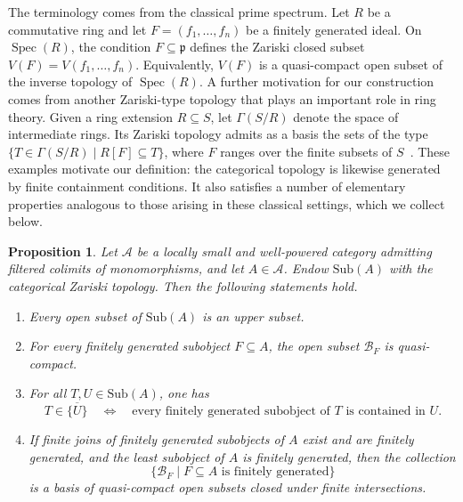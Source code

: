 \documentclass{amsproc}
\theoremstyle{definition}
\theoremstyle{plain}
\newtheorem{Prop}[theorem]{Proposition}
\theoremstyle{remark}
\numberwithin{equation}{section}
\newcommand{\Cal}[1]{{\mathcal #1}}
\newcommand{\Spec}{\operatorname{Spec}}
\newcommand{\sub}[1]{\mathrm{Sub} (#1)}
\begin{document}
The terminology comes from the classical prime spectrum. Let $R$ be a commutative ring and let $F=(f_1,\ldots,f_n)$ be a finitely generated ideal. On $\Spec(R)$, the condition $F\subseteq\mathfrak p$
defines the Zariski closed subset $V(F)=V(f_1,\ldots,f_n)$.
Equivalently, $V(F)$ is a quasi-compact open subset of the inverse topology of $\Spec(R)$. 
A further motivation for our construction comes from another Zariski-type topology that plays an important role in ring theory. Given a ring extension $R\subseteq S$, let $\Gamma(S/R)$ denote the space of intermediate rings. Its Zariski topology admits as a basis the sets of the type
$\{T\in\Gamma(S/R)\mid R[F]\subseteq T\}$, where $F$ ranges over the finite subsets of $S$~\cite[Proposition~3.5]{finocchiaro-ultrafiltri}.
These examples motivate our definition: the categorical topology is likewise generated by finite containment conditions. It also satisfies a number of elementary properties analogous to those arising in these classical settings, which we collect below.

\begin{Prop}\label{basic-properties-zariski}
Let $\mathscr A$ be a locally small and well-powered category admitting filtered colimits of monomorphisms, and let $A\in\mathscr A$. Endow $\sub A$ with the categorical Zariski topology. Then the following statements hold.
\begin{enumerate}
    \item Every open subset of $\sub A$ is an upper subset.
    \item For every finitely generated subobject $F\subseteq A$, the open subset $\Cal B_F$ is quasi-compact.
    \item For all $T,U\in\sub A$, one has
    $$
    T\in\overline{\{U\}}
    \quad\Longleftrightarrow\quad
    \text{every finitely generated subobject of $T$ is contained in $U$}.
    $$
    \item If finite joins of finitely generated subobjects of $A$ exist and are finitely generated, and the least subobject of $A$ is finitely generated, then the collection
    $$
    \{\Cal B_F\mid F\subseteq A\text{ is finitely generated}\}
    $$
    is a basis of quasi-compact open subsets closed under finite intersections.
\end{enumerate}
\end{Prop}
\end{document}
